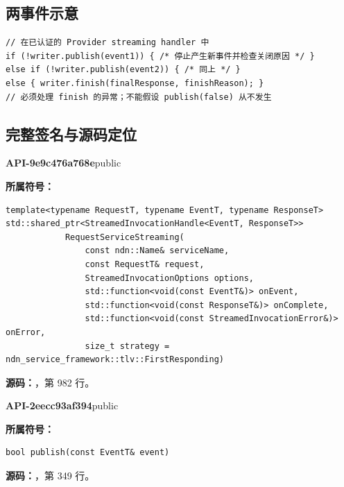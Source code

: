 \subsection{两事件示意}

\begin{Verbatim}[fontsize=\footnotesize,breaklines,breakanywhere]
// 在已认证的 Provider streaming handler 中
if (!writer.publish(event1)) { /* 停止产生新事件并检查关闭原因 */ }
else if (!writer.publish(event2)) { /* 同上 */ }
else { writer.finish(finalResponse, finishReason); }
// 必须处理 finish 的异常；不能假设 publish(false) 从不发生
\end{Verbatim}

\subsection{完整签名与源码定位}

\textbf{API-9e9c476a768e}\quad public\par
\textbf{所属符号：}\par
\begin{Verbatim}[fontsize=\footnotesize,breaklines,breakanywhere]
template<typename RequestT, typename EventT, typename ResponseT>
std::shared_ptr<StreamedInvocationHandle<EventT, ResponseT>>
            RequestServiceStreaming(
                const ndn::Name& serviceName,
                const RequestT& request,
                StreamedInvocationOptions options,
                std::function<void(const EventT&)> onEvent,
                std::function<void(const ResponseT&)> onComplete,
                std::function<void(const StreamedInvocationError&)> onError,
                size_t strategy = ndn_service_framework::tlv::FirstResponding)
\end{Verbatim}
\textbf{源码：}，第 982 行。\par

\textbf{API-2eecc93af394}\quad public\par
\textbf{所属符号：}\par
\begin{Verbatim}[fontsize=\footnotesize,breaklines,breakanywhere]
bool publish(const EventT& event)
\end{Verbatim}
\textbf{源码：}，第 349 行。\par

